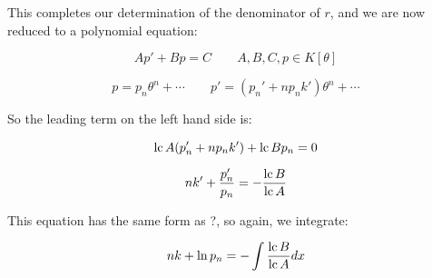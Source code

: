 This completes our determination of the denominator of $r$, and we
are now reduced to a polynomial equation:

$$A p' + B p = C \qquad A,B,C,p \in K[\theta]$$

$$p = p_n \theta^n + \cdots \qquad p' = (p_n' + n p_n k') \theta^n + \cdots$$

So the leading term on the left hand side is:

$${\rm lc\,} A (p_n' + n p_n k') + {\rm lc\,} B p_n = 0$$

$$n k' + \frac{p_n'}{p_n} = - \frac{{\rm lc}\, B}{{\rm lc}\, A}$$

This equation has the same form as ?, so again, we integrate:

$$n k + \ln p_n = - \int \frac{{\rm lc}\, B}{{\rm lc}\, A} dx$$

\begin{comment}
\vfill\eject

Consider an irreducible factor $F$ that appears both as a factor of $A$
and also in $q$'s denominator, with
multiplicity $m \ge 1 $, so $q = N/(F^m D)$, and we rewrite the Risch equation:

$$A F q' - B q = C$$

$$A F \frac{N' F D - m N F' D - N F D'}{F^{m+1} D^2} - B \frac{N}{F^m D} = C$$

$$A F N' D - m A F' N D - A F N D' - B N D = C D^2 F^{m}$$

$$ - m A F' N D - B N D  = C D^2 F^{m} - A F N' D + A F N D'$$

$$ - (m A F' - B ) N D  = F (C D^2 F^{m-1} - A N' D - A N D')$$

Now, the right hand side of this equation is a multiple of $F$, so the
left hand side must also be a multiple of $F$.  However, $F$ is
irreducible and is relatively prime to both $N$ and $D$, so the only way
the left hand side can be a multiple of $F$ is if $m A F' - B$ is a
multiple of $F$.

Why?  All of these variables
are polynomials in ${\mathbb C}[x]$, so this equation is an equality
between polynomials.  Because ${\mathbb C}[x]$ is a {\it unique factorization domain}, its
polynomials can factor in essentially one way only, so if $F$ factors
the right hand side, it must also factor the left.  If $F$ were not
irreducible, then it might have two factors, one contributed by $N$
and the other contributed by $D$.  It's the irreducibility of $F$,
the unique factorization of polynomials in ${\mathbb C}[x]$, and
our assumption that $N$ and $D$ are relatively prime to $F$
that makes this argument work.

The simplest way to enforce this factorization requirement is to use
the resultant (Theorem \ref{resultant theorem}):

$${\rm res}_x(m A F' - B, F) = 0$$

We calculate this resultant for each irreducible factor $F$ of $A$,
and this gives us $m$, the power to which $F$ appears in $q$'s
denominator.  If this resultant equation has no positive integer
solution, then $F$ can not appear at all in $q$'s denominator.

\end{comment}
